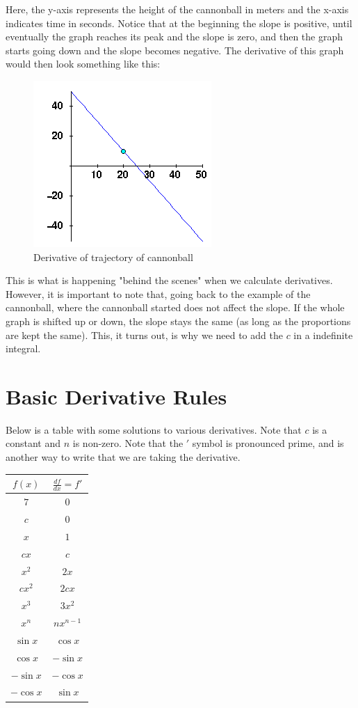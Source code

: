 Here, the y-axis represents the height of the cannonball in meters and the x-axis indicates time in seconds. 
Notice that at the beginning the slope is positive, until eventually the graph reaches its peak and the slope is zero, and then the graph starts going down and the slope becomes negative. 
The derivative of this graph would then look something like this:

\begin{figure}[H]
\caption{Derivative of trajectory of cannonball}
\includegraphics[scale=0.8]{../derivative.png}
\end{figure}

This is what is happening "behind the scenes" when we calculate derivatives.
However, it is important to note that, going back to the example of the cannonball, where the cannonball started does not affect the slope. 
If the whole graph is shifted up or down, the slope stays the same (as long as the proportions are kept the same). 
This, it turns out, is why we need to add the $c$ in a indefinite integral. 

\chapter{Basic Derivative Rules}
Below is a table with some solutions to various derivatives. Note that $c$ is a constant and $n$ is non-zero. Note that the $'$ symbol is pronounced prime, and is another way to write that we are taking the derivative. 


\begin{tabular}{c|c}
    $f(x)$ & $\frac{df}{dx} = f'$\\
    \hline
       $7$  & $0$ \\
        $c$ & $0$ \\
        $x$ & $1$ \\
        $cx$ & $c$ \\
        $x^2$ & $2x$ \\
        $cx^2$ & $2cx$ \\
        $x^3$ & $3x^2$ \\
        $x^n$ & $nx^{n-1}$ \\
        $\sin x$ & $\cos x$ \\
        $\cos x$ & $-\sin x$ \\
        $- \sin x$ & $- \cos x$ \\
        $-\cos x$ & $\sin x$
\end{tabular}

